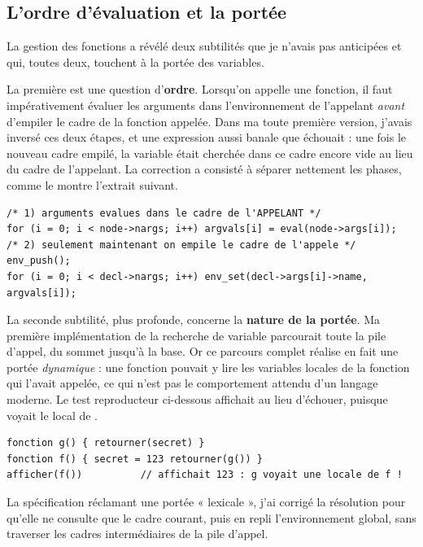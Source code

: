 \subsection{L'ordre d'évaluation et la portée}

La gestion des fonctions a révélé deux subtilités que je n'avais pas anticipées et
qui, toutes deux, touchent à la portée des variables.

La première est une question d'\textbf{ordre}. Lorsqu'on appelle une fonction,
il faut impérativement évaluer les arguments dans l'environnement de l'appelant
\emph{avant} d'empiler le cadre de la fonction appelée. Dans ma toute première
version, j'avais inversé ces deux étapes, et une expression aussi banale que
 échouait : une fois le nouveau cadre empilé, la variable
 était cherchée dans ce cadre encore vide au lieu du cadre de l'appelant.
La correction a consisté à séparer nettement les phases, comme le montre l'extrait
suivant.

\begin{lstlisting}[style=c,caption={L'ordre correct : évaluer les arguments avant d'empiler le cadre.}]
/* 1) arguments evalues dans le cadre de l'APPELANT */
for (i = 0; i < node->nargs; i++) argvals[i] = eval(node->args[i]);
/* 2) seulement maintenant on empile le cadre de l'appele */
env_push();
for (i = 0; i < decl->nargs; i++) env_set(decl->args[i]->name, argvals[i]);
\end{lstlisting}

La seconde subtilité, plus profonde, concerne la \textbf{nature de la portée}. Ma
première implémentation de la recherche de variable parcourait toute la pile
d'appel, du sommet jusqu'à la base. Or ce parcours complet réalise en fait une
portée \emph{dynamique} : une fonction pouvait y lire les variables locales de la
fonction qui l'avait appelée, ce qui n'est pas le comportement attendu d'un langage
moderne. Le test reproducteur ci-dessous affichait  au lieu d'échouer,
puisque  voyait le  local de .

\begin{lstlisting}[style=ilang,caption={Cas qui révèle la portée dynamique (corrigé depuis).}]
fonction g() { retourner(secret) }
fonction f() { secret = 123 retourner(g()) }
afficher(f())          // affichait 123 : g voyait une locale de f !
\end{lstlisting}

La spécification réclamant une portée « lexicale », j'ai corrigé la résolution
pour qu'elle ne consulte que le cadre courant, puis en repli l'environnement
global, sans traverser les cadres intermédiaires de la pile d'appel.

